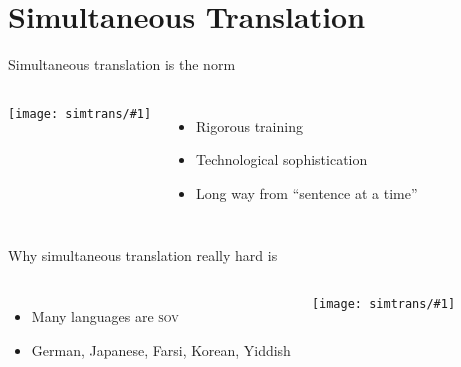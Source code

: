 \documentclass[compress]{beamer}
\newcommand{\gfxs}[2]{
\begin{center}
	\texttt{[image: simtrans/\#1]}
\end{center}
}
\begin{document}
\section{Simultaneous Translation}

\begin{frame}{Simultaneous translation is the norm}

  \begin{columns}
       \gfxs{nuremberg_translators}{.9}
       \begin{itemize}
         \item Rigorous training
         \item Technological sophistication
         \item Long way from ``sentence at a time''
       \end{itemize}
  \end{columns}

\end{frame}

\begin{frame}{Why simultaneous translation really hard is}

  \begin{columns}
      \begin{itemize}
        \item Many languages are \textsc{sov}
        \item \alert<2>{German}, Japanese, Farsi, Korean, \alert<3>{Yiddish}
      \end{itemize}
      \gfxs{yoda}{.6}
  \end{columns}

  \centering


\end{frame}
\end{document}
